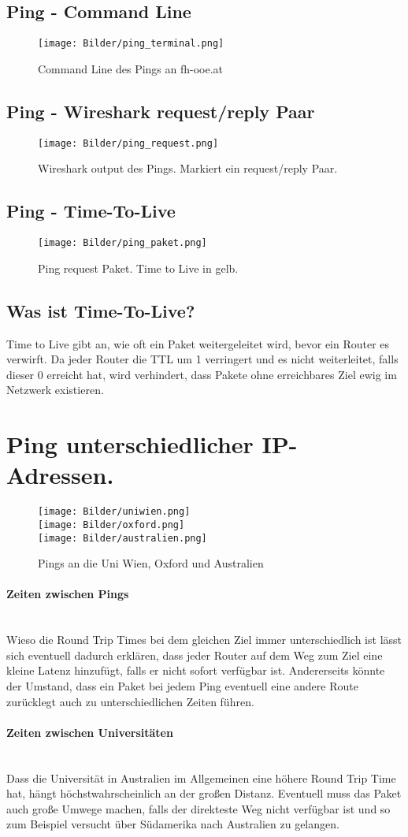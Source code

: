\documentclass{article}
\newcommand{\paragraphlb}[1]{\paragraph{#1}\mbox{}\\}
\begin{document}
	\subsection{Ping - Command Line}
	\begin{figure}[H]
	\centering
	\texttt{[image: Bilder/ping\_terminal.png]}
	\caption{Command Line des Pings an fh-ooe.at}
	\end{figure}
	\subsection{Ping - Wireshark request/reply Paar}
	\begin{figure}[H]
	\centering
	\texttt{[image: Bilder/ping\_request.png]}
	\caption{Wireshark output des Pings. Markiert ein request/reply Paar.}
	\end{figure}
	\subsection{Ping - Time-To-Live}
	\begin{figure}[H]
	\centering
	\texttt{[image: Bilder/ping\_paket.png]}
	\caption{Ping request Paket. Time to Live in gelb.}
	\end{figure}
	\subsection{Was ist Time-To-Live?}
	Time to Live gibt an, wie oft ein Paket weitergeleitet wird, bevor ein Router es verwirft. Da jeder Router die TTL um 1 verringert und es nicht weiterleitet, falls dieser 0 erreicht hat, wird verhindert, dass Pakete ohne erreichbares Ziel ewig im Netzwerk existieren.
	\section{Ping unterschiedlicher IP-Adressen.}
	\begin{figure}[H]
	\centering
	\texttt{[image: Bilder/uniwien.png]} \\
	\texttt{[image: Bilder/oxford.png]} \\
	\texttt{[image: Bilder/australien.png]}\\
	\caption{Pings an die Uni Wien, Oxford und Australien}
	\end{figure}
	\paragraphlb{Zeiten zwischen Pings}
	Wieso die Round Trip Times bei dem gleichen Ziel immer unterschiedlich ist lässt sich eventuell dadurch erklären, dass jeder Router auf dem Weg zum Ziel eine kleine Latenz hinzufügt, falls er nicht sofort verfügbar ist. Andererseits könnte der Umstand, dass ein Paket bei jedem Ping eventuell eine andere Route zurücklegt auch zu unterschiedlichen Zeiten führen.
	\paragraphlb{Zeiten zwischen Universitäten}
	Dass die Universität in Australien im Allgemeinen eine höhere Round Trip Time hat, hängt höchstwahrscheinlich an der großen Distanz. Eventuell muss das Paket auch große Umwege machen, falls der direkteste Weg nicht verfügbar ist und so zum Beispiel versucht über Südamerika nach Australien zu gelangen.
\end{document}
